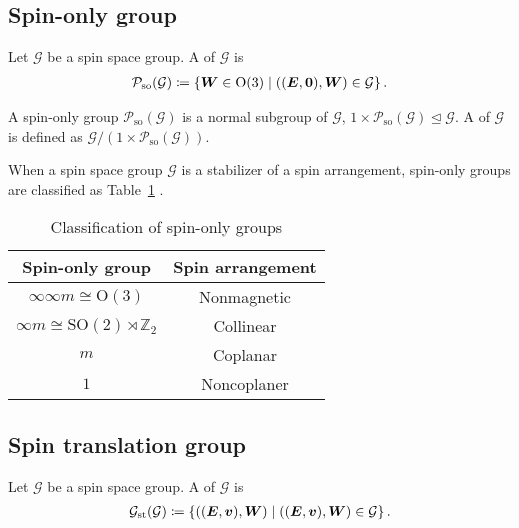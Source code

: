 \subsection{Spin-only group}

\begin{screen}
  \begin{definition}
    Let $\mathcal{G}$ be a spin space group.
    A  of $\mathcal{G}$ is
    \begin{align}
      \mathcal{P}_{\mathrm{so}}(\mathcal{G})
      \coloneqq
      \left\{  \bm{W} \in \mathrm{O}(3)  \mathrel{}\middle|\mathrel{}  ((\bm{E}, \bm{0}), \bm{W}) \in \mathcal{G}  \right\}.
    \end{align}
  \end{definition}
\end{screen}

A spin-only group $\mathcal{P}_{\mathrm{so}}(\mathcal{G})$ is a normal subgroup of $\mathcal{G}$, $1 \times \mathcal{P}_{\mathrm{so}}(\mathcal{G}) \trianglelefteq \mathcal{G}$.
A  of $\mathcal{G}$ is defined as $\mathcal{G} / (1 \times \mathcal{P}_{\mathrm{so}}(\mathcal{G}))$.

When a spin space group $\mathcal{G}$ is a stabilizer of a spin arrangement, spin-only groups are classified as Table~\ref{tab:spin_only_group} \cite{LITVIN1974538,PhysRevX.12.021016}.

\begin{table}[tb]
  \centering
  \caption{Classification of spin-only groups}
  \label{tab:spin_only_group}
  \begin{tabular}{cc}
    \hline \hline
    Spin-only group & Spin arrangement \\
    \hline
    $\infty \infty m \cong \mathrm{O}(3)$ & Nonmagnetic \\
    $\infty m \cong \mathrm{SO}(2) \rtimes \mathbb{Z}_{2} $ & Collinear \\
    $m$ & Coplanar \\
    $1$ & Noncoplaner \\
    \hline \hline
  \end{tabular}
\end{table}

\subsection{Spin translation group}

\begin{screen}
  \begin{definition}
    Let $\mathcal{G}$ be a spin space group.
    A  of $\mathcal{G}$ is
    \begin{align}
      \mathcal{G}_{\mathrm{st}}(\mathcal{G})
      \coloneqq
      \left\{  ((\bm{E}, \bm{v}), \bm{W})  \mathrel{}\middle|\mathrel{}  ((\bm{E}, \bm{v}), \bm{W}) \in \mathcal{G} \right\}.
    \end{align}
  \end{definition}
\end{screen}

